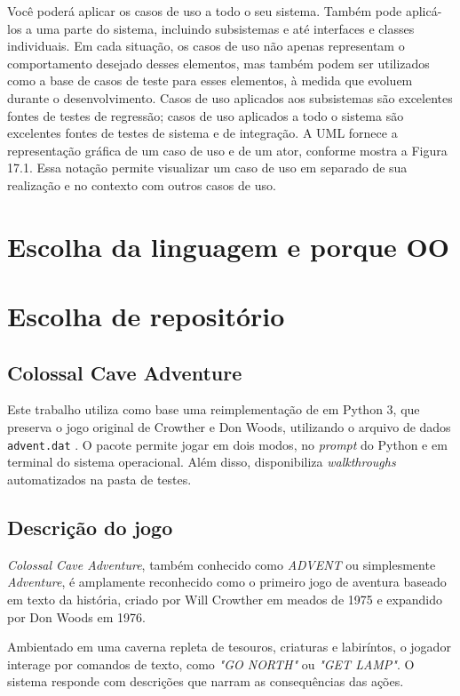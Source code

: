\documentclass[12pt,a4paper]{article}
\begin{document}
Você poderá aplicar os casos de uso a todo o seu sistema. Também pode
aplicá-los a uma parte do sistema, incluindo subsistemas e até interfaces e classes
individuais. Em cada situação, os casos de uso não apenas representam o comportamento desejado desses elementos, mas também podem ser utilizados como
a base de casos de teste para esses elementos, à medida que evoluem durante o
desenvolvimento. Casos de uso aplicados aos subsistemas são excelentes fontes
de testes de regressão; casos de uso aplicados a todo o sistema são excelentes
fontes de testes de sistema e de integração. A UML fornece a representação gráfica de um caso de uso e de um ator, conforme mostra a Figura 17.1. Essa notação permite visualizar um caso de uso em separado de sua realização e no contexto com outros casos de uso.
\section{Escolha da linguagem e porque OO}
\section{Escolha de repositório}

\subsection{Colossal Cave Adventure}
Este trabalho utiliza como base uma reimplementação de \textcite{rhodes_adventure_py} em Python 3, que preserva o jogo original de Crowther e Don Woods, utilizando o arquivo de dados \texttt{advent.dat} \textcite{adventure_original_sources}. O pacote permite jogar em dois modos, no \emph{prompt} do Python e em terminal do sistema operacional. Além disso, disponibiliza \textit{walkthroughs} automatizados na pasta de testes.

\subsection{Descrição do jogo}

\textit{Colossal Cave Adventure}, também conhecido como \textit{ADVENT} ou simplesmente \textit{Adventure}, é amplamente reconhecido como o primeiro jogo de aventura baseado em texto da história, criado por Will Crowther em meados de 1975 e expandido por Don Woods em 1976. 

Ambientado em uma caverna repleta de tesouros, criaturas e labiríntos, o jogador interage por comandos de texto, como \textit{"GO NORTH"} ou \textit{"GET LAMP"}. O sistema responde com descrições que narram as consequências das ações.
\end{document}
